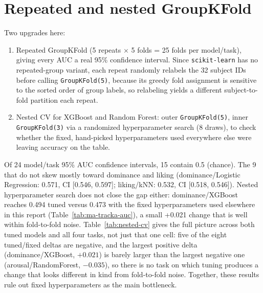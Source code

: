 \documentclass[11pt]{report}
\begin{document}
\section{Repeated and nested GroupKFold}
\label{sec:s10}
Two upgrades here:
\begin{enumerate}
  \item Repeated GroupKFold (5 repeats $\times$ 5 folds = 25 folds per
        model/task), giving every AUC a real 95\% confidence interval.
        Since \texttt{scikit-learn} has no repeated-group variant, each
        repeat randomly relabels the 32 subject IDs before calling
        \texttt{GroupKFold(5)}, because its greedy fold assignment is
        sensitive to the sorted order of group labels, so relabeling yields
        a different subject-to-fold partition each repeat.
  \item Nested CV for XGBoost and Random Forest: outer \texttt{GroupKFold(5)},
        inner \texttt{GroupKFold(3)} via a randomized hyperparameter search
        (8 draws), to check whether the fixed, hand-picked hyperparameters
        used everywhere else were leaving accuracy on the table.
\end{enumerate}
Of 24 model/task 95\% AUC confidence intervals, 15 contain 0.5 (chance). The
9 that do not skew mostly toward dominance and liking (dominance/Logistic
Regression: 0.571, CI [0.546, 0.597]; liking/kNN: 0.532, CI [0.518, 0.546]).
Nested hyperparameter search does not close the gap either: dominance/XGBoost
reaches 0.494 tuned versus 0.473 with the fixed hyperparameters used
elsewhere in this report (Table~\ref{tab:ma-tracka-auc}), a small +0.021
change that is well within fold-to-fold noise. Table~\ref{tab:nested-cv}
gives the full picture across both tuned models and all four tasks, not just
that one cell: five of the eight tuned/fixed deltas are negative, and the
largest positive delta (dominance/XGBoost, $+0.021$) is barely larger than
the largest negative one (arousal/RandomForest, $-0.035$), so there is no
task on which tuning produces a change that looks different in kind from
fold-to-fold noise. Together, these results rule out fixed hyperparameters
as the main bottleneck.
\end{document}
